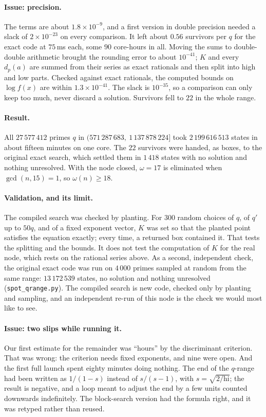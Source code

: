 \documentclass[11pt]{amsart}
\theoremstyle{remark}
\begin{document}
\paragraph{Issue: precision.} The terms are about $1.8 \times 10^{-9}$, and a
first version in double precision needed a slack of $2 \times 10^{-23}$ on every
comparison. It left about $0.56$ survivors per $q$ for the exact code at
$75$\,ms each, some $90$ core-hours in all. Moving the sums to double-double
arithmetic brought the rounding error to about $10^{-41}$; $K$ and every
$d_p(a)$ are summed from their series as exact rationals and then split into
high and low parts. Checked against exact rationals, the computed bounds on
$\log f(x)$ are within $1.3 \times 10^{-41}$. The slack is $10^{-35}$, so a
comparison can only keep too much, never discard a solution. Survivors fell
to $22$ in the whole range.

\paragraph{Result.} All $27\,577\,412$ primes $q$ in
$(571\,287\,683,\ 1\,137\,878\,224]$ took $2\,199\,616\,513$ states in about
fifteen minutes on one core. The $22$ survivors were handed, as boxes, to the
original exact search, which settled them in $1\,418$ states with no solution
and nothing unresolved. With the node closed, $\omega = 17$ is eliminated when
$\gcd(n,15) = 1$, so $\omega(n) \ge 18$.

\paragraph{Validation, and its limit.} The compiled search was checked by
planting. For $300$ random choices of $q$, of $q'$ up to $50q$, and of a fixed
exponent vector, $K$ was set so that the planted point satisfies the equation
exactly; every time, a returned box contained it. That tests the splitting and
the bounds. It does not test the computation of $K$ for the real node, which
rests on the rational series above. As a second, independent check, the
original exact code was run on $4\,000$ primes sampled at random from the same
range: $13\,172\,539$ states, no solution and nothing unresolved
(\texttt{spot\_qrange.py}). The
compiled search is new code, checked only by planting and sampling, and an
independent re-run of this node is the check we would most like to see.

\paragraph{Issue: two slips while running it.} Our first estimate for the
remainder was ``hours'' by the discriminant criterion. That was wrong: the
criterion needs fixed exponents, and nine were open. And the first full launch
spent eighty minutes doing nothing. The end of the $q$-range had been written
as $1/(1-s)$ instead of $s/(s-1)$, with $s = \sqrt{2/\mathrm{hi}}$; the result
is negative, and a loop meant to adjust the end by a few units counted downwards
indefinitely. The block-search version had the formula right, and it was
retyped rather than reused.
\end{document}

